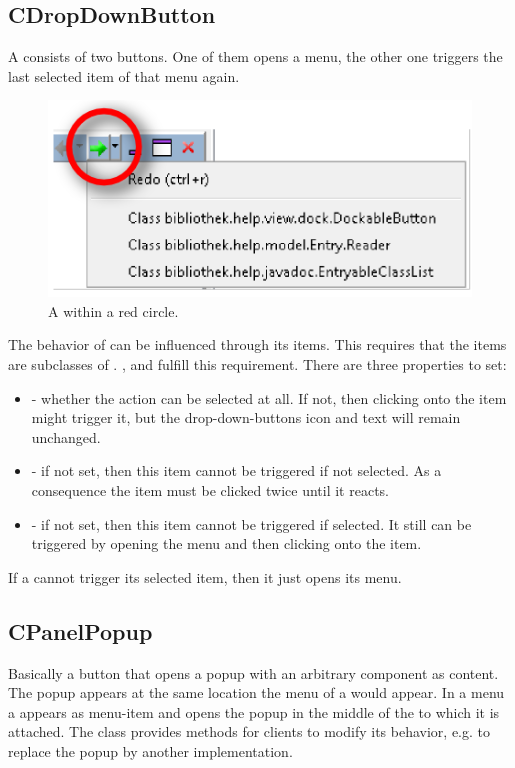 \subsection{CDropDownButton}
A  consists of two buttons. One of them opens a menu, the other one triggers the last selected item of that menu again. 

\begin{figure}[ht]
\centering
\includegraphics[scale=0.75]{actions/cdropdown}
\caption{A  within a red circle.}
\label{fig:cdropdown}
\end{figure}

The behavior of  can be influenced through its items. This requires that the items are subclasses of . ,  and  fulfill this requirement. There are three properties to set:
\begin{itemize}
 \item {} - whether the action can be selected at all. If not, then clicking onto the item might trigger it, but the drop-down-buttons icon and text will remain unchanged.
 \item {} - if not set, then this item cannot be triggered if not selected. As a consequence the item must be clicked twice until it reacts.
 \item {} - if not set, then this item cannot be triggered if selected. It still can be triggered by opening the menu and then clicking onto the item.
\end{itemize}
If a  cannot trigger its selected item, then it just opens its menu.

\subsection{CPanelPopup}
Basically a button that opens a popup with an arbitrary component as content. The popup appears at the same location the menu of a  would appear. In a menu a  appears as menu-item and opens the popup in the middle of the  to which it is attached. The class provides methods for clients to modify its behavior, e.g. to replace the popup by another implementation.

